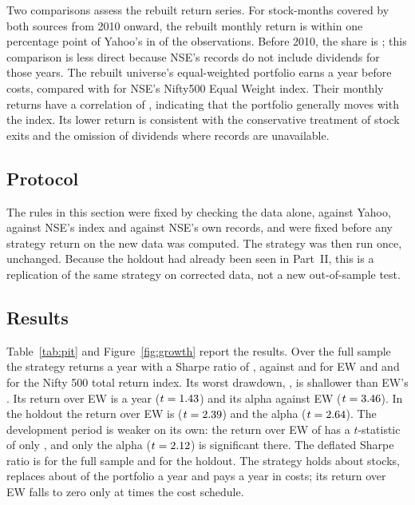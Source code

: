 \documentclass[11pt]{article}
\begin{document}
Two comparisons assess the rebuilt return series. For stock-months covered by both
sources from 2010 onward, the rebuilt monthly return is within one percentage point
of Yahoo's in \YahooAgree{} of the \YahooMonths{} observations. Before 2010, the
share is \YahooAgreeEarly; this comparison is less direct because NSE's records do
not include dividends for those years. The rebuilt universe's equal-weighted
portfolio earns \PitEwGrossCagr{} a year before costs, compared with
\IndexEwCagr{} for NSE's Nifty500 Equal Weight index. Their monthly returns have a
correlation of \PitEwGrossCorr, indicating that the portfolio generally moves with
the index. Its lower return is consistent with the conservative treatment of stock
exits and the omission of dividends where records are unavailable.

\subsection{Protocol}

The rules in this section were fixed by checking the data alone, against Yahoo,
against NSE's index and against NSE's own records, and were fixed before any
strategy return on the new data was computed. The strategy was then run once,
unchanged. Because the holdout had already been seen in Part~II, this is a
replication of the same strategy on corrected data, not a new out-of-sample test.

\subsection{Results}

Table~\ref{tab:pit} and Figure~\ref{fig:growth} report the results.
Over the full sample the strategy returns \PitCagrFull{} a year with a Sharpe ratio
of \PitSharpeFull, against \PitEwCagrFull{} and \PitEwSharpeFull{} for EW and
\PitNiftyCagrFull{} and \PitNiftySharpeFull{} for the Nifty 500 total return index.
Its worst drawdown, \PitMaxDDFull, is shallower than EW's \PitEwMaxDDFull. Its return
over EW is \PitActiveFull{} a year ($t = 1.43$) and its alpha against EW
\PitAlphaFull{} ($t = 3.46$). In the holdout the return over EW is
\PitActiveHold{} ($t = 2.39$) and the alpha \PitAlphaHold{}
($t = 2.64$). The development period is weaker on its own: the return over
EW of \PitActiveDev{} has a $t$-statistic of only \PitActiveTDev, and only the alpha
($t = 2.12$) is significant there. The deflated Sharpe ratio is
\PitDsrFull{} for the full sample and \PitDsrHold{} for the holdout. The strategy
holds about \PitNamesFull{} stocks, replaces about \PitTurnoverFull{} of the
portfolio a year and pays \PitCostFull{} a year in costs; its return over EW falls to
zero only at \PitBreakEvenFull{} times the cost schedule.
\end{document}
